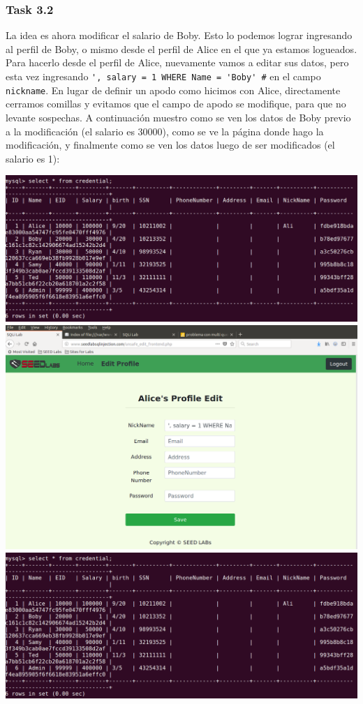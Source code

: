 \documentclass[11pt]{article}
\begin{document}
\subsubsection*{Task 3.2}
La idea es ahora modificar el salario de Boby. Esto lo podemos lograr ingresando al perfil de Boby, o mismo 
desde el perfil de Alice en el que ya estamos logueados. Para hacerlo desde el perfil de Alice, nuevamente 
vamos a editar sus datos, pero esta vez ingresando \verb|', salary = 1 WHERE Name = 'Boby' #| en el campo 
\verb|nickname|. En lugar de definir un apodo como hicimos con Alice, directamente cerramos comillas y 
evitamos que el campo de apodo se modifique, para que no levante sospechas. A continuación muestro como se 
ven los datos de Boby previo a la modificación (el salario es 30000), como se ve la página donde hago la 
modificación, y finalmente como se ven los datos luego de ser modificados (el salario es 1):
\begin{center}
    \includegraphics[scale=.34]{task3_2_1_sql.png}
    \includegraphics[scale=.34]{task3_2_2_sql.png}
    \includegraphics[scale=.34]{task3_2_3_sql.png}
\end{center}
\end{document}
